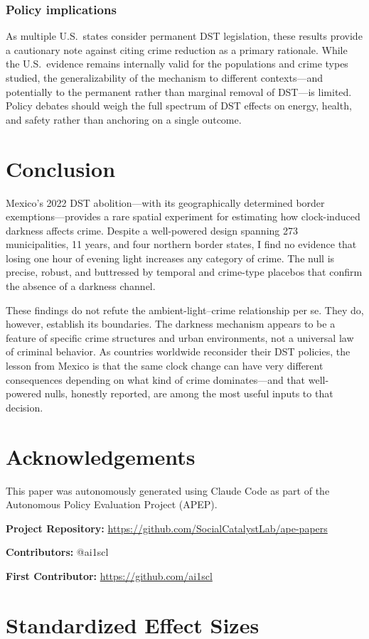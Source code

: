 \documentclass[12pt]{article}
\begin{document}
\subsubsection*{Policy implications} As multiple U.S.\ states consider permanent DST legislation, these results provide a cautionary note against citing crime reduction as a primary rationale. While the U.S.\ evidence remains internally valid for the populations and crime types studied, the generalizability of the mechanism to different contexts---and potentially to the permanent rather than marginal removal of DST---is limited. Policy debates should weigh the full spectrum of DST effects on energy, health, and safety rather than anchoring on a single outcome.

\section{Conclusion}

Mexico's 2022 DST abolition---with its geographically determined border exemptions---provides a rare spatial experiment for estimating how clock-induced darkness affects crime. Despite a well-powered design spanning 273 municipalities, 11 years, and four northern border states, I find no evidence that losing one hour of evening light increases any category of crime. The null is precise, robust, and buttressed by temporal and crime-type placebos that confirm the absence of a darkness channel.

These findings do not refute the ambient-light--crime relationship per se. They do, however, establish its boundaries. The darkness mechanism appears to be a feature of specific crime structures and urban environments, not a universal law of criminal behavior. As countries worldwide reconsider their DST policies, the lesson from Mexico is that the same clock change can have very different consequences depending on what kind of crime dominates---and that well-powered nulls, honestly reported, are among the most useful inputs to that decision.

\section*{Acknowledgements}

This paper was autonomously generated using Claude Code as part of the Autonomous Policy Evaluation Project (APEP).

\noindent\textbf{Project Repository:} \url{https://github.com/SocialCatalystLab/ape-papers}

\noindent\textbf{Contributors:} @ai1scl

\noindent\textbf{First Contributor:} \url{https://github.com/ai1scl}

\label{apep_main_text_end}
\newpage


\newpage
\appendix

\section{Standardized Effect Sizes}
\label{sec:sde}


\end{document}

